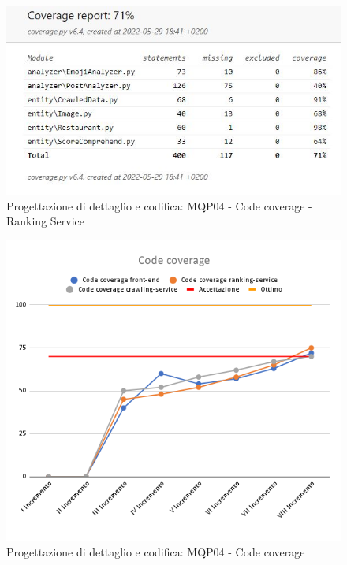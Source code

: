 \begin{figure}[H]
\centering
    \includegraphics[scale=0.50]{Sezioni/images/pb prodotto/coverage-RS.JPG}
    \caption{Progettazione di dettaglio e codifica: MQP04 - Code coverage - Ranking Service}
\end{figure}

\begin{figure}[H]
    \centering
    \includegraphics[scale=0.50]{Sezioni/images/pb prodotto/Code coverage.png}
    \caption{Progettazione di dettaglio e codifica: MQP04 - Code coverage}
\end{figure}

